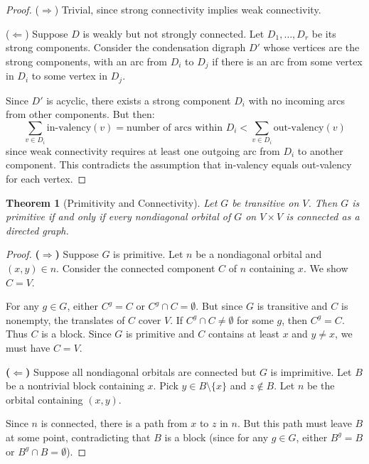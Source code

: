 \documentclass[12pt,a4paper,openany]{book}
\newtheorem{theorem}{Theorem}[section]
\begin{document}
\begin{proof}
($\Rightarrow$) Trivial, since strong connectivity implies weak connectivity.

($\Leftarrow$) Suppose $D$ is weakly but not strongly connected. Let $D_1, \dots, D_r$ be its strong components. Consider the condensation digraph $D'$ whose vertices are the strong components, with an arc from $D_i$ to $D_j$ if there is an arc from some vertex in $D_i$ to some vertex in $D_j$.

Since $D'$ is acyclic, there exists a strong component $D_i$ with no incoming arcs from other components. But then:
\[
\sum_{v \in D_i} \text{in-valency}(v) = \text{number of arcs within } D_i < \sum_{v \in D_i} \text{out-valency}(v)
\]
since weak connectivity requires at least one outgoing arc from $D_i$ to another component. This contradicts the assumption that in-valency equals out-valency for each vertex.
\end{proof}

\begin{theorem}[Primitivity and Connectivity]\label{thm:primitivity-connectivity}
Let $G$ be transitive on $V$. Then $G$ is primitive if and only if every nondiagonal orbital of $G$ on $V \times V$ is connected as a directed graph.
\end{theorem}

\begin{proof}
\textbf{($\Rightarrow$)} Suppose $G$ is primitive. Let $n$ be a nondiagonal orbital and $(x,y) \in n$. Consider the connected component $C$ of $n$ containing $x$. We show $C = V$.

For any $g \in G$, either $C^g = C$ or $C^g \cap C = \emptyset$. But since $G$ is transitive and $C$ is nonempty, the translates of $C$ cover $V$. If $C^g \cap C \neq \emptyset$ for some $g$, then $C^g = C$. Thus $C$ is a block. Since $G$ is primitive and $C$ contains at least $x$ and $y \neq x$, we must have $C = V$.

\textbf{($\Leftarrow$)} Suppose all nondiagonal orbitals are connected but $G$ is imprimitive. Let $B$ be a nontrivial block containing $x$. Pick $y \in B \setminus \{x\}$ and $z \notin B$. Let $n$ be the orbital containing $(x,y)$.

Since $n$ is connected, there is a path from $x$ to $z$ in $n$. But this path must leave $B$ at some point, contradicting that $B$ is a block (since for any $g \in G$, either $B^g = B$ or $B^g \cap B = \emptyset$).
\end{proof}
\end{document}
